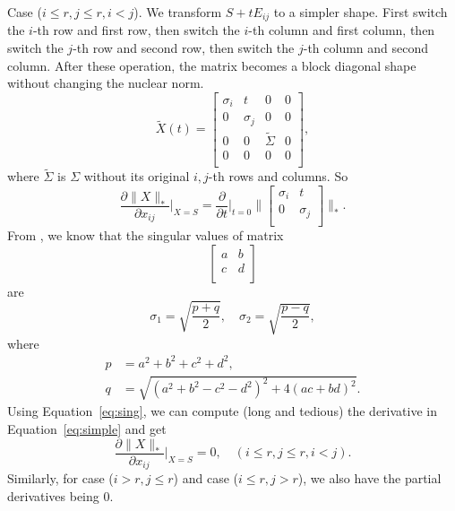 Case ($i\le r,j\le r,i<j$).
We transform $S+tE_{ij}$ to a simpler shape.
First switch the $i$-th row and first row,
then switch the $i$-th column and first column,
then switch the $j$-th row and second row,
then switch the $j$-th column and second column.
After these operation,
the matrix becomes a block diagonal shape without changing the nuclear norm.
\begin{equation}
    \tilde X(t)=\begin{bmatrix}
    \sigma_i & t        & 0            & 0 \\
    0        & \sigma_j & 0            & 0 \\
    0        & 0        & \tilde\Sigma & 0 \\
    0        & 0        & 0            & 0 \\
\end{bmatrix},
\end{equation}
where $\tilde\Sigma$ is $\Sigma$ without its original $i,j$-th rows and columns.
So
\begin{equation}\label{eq:simple}
    \frac{\partial\|X\|_*}{\partial x_{ij}}\bigg|_{X=S}
        =\frac{\partial}{\partial t}\bigg|_{t=0}
            \bigg\|\begin{bmatrix}
                \sigma_i & t        \\
                0        & \sigma_j \\
            \end{bmatrix}\bigg\|_*.
\end{equation}
From \cite{svd},
we know that the singular values of matrix
\begin{equation}
    \begin{bmatrix}
        a & b \\
        c & d \\
    \end{bmatrix}
\end{equation}
are
\begin{equation}\label{eq:sing}
    \sigma_1=\sqrt{\frac{p+q}{2}},\quad
    \sigma_2=\sqrt{\frac{p-q}{2}},
\end{equation}
where
\begin{equation}
\begin{split}
    p &= a^2+b^2+c^2+d^2, \\
    q &= \sqrt{(a^2+b^2-c^2-d^2)^2+4(ac+bd)^2}.
\end{split}
\end{equation}
Using Equation~\eqref{eq:sing},
we can compute (long and tedious) the derivative in Equation~\eqref{eq:simple}
and get
\begin{equation}
    \frac{\partial\|X\|_*}{\partial x_{ij}}\bigg|_{X=S}
        = 0,\quad (i\le r,j\le r,i<j).
\end{equation}
Similarly,
for case ($i>r, j\le r$)
and case ($i\le r, j>r$),
we also have the partial derivatives being $0$.

